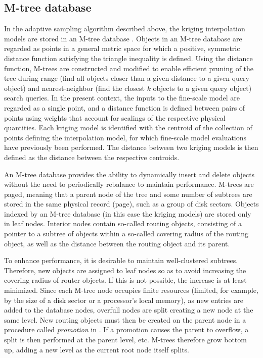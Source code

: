 \documentclass[12pt]{article}
\begin{document}
\subsection{M-tree database}

In the adaptive sampling algorithm described above, the kriging
interpolation models are stored in an M-tree database
\cite{Ciaccia1997}.  Objects in an M-tree database are regarded as points in
a general metric space for which a positive, symmetric distance
function satisfying the triangle inequality is defined.  Using the
distance function, M-trees are constructed and modified to enable efficient
pruning of the tree during range (find all objects closer than a given
distance to a given query object) and nearest-neighbor (find the
closest $k$ objects to a given query object) search queries.  
In the present context, the inputs to the fine-scale model 
are regarded as a single point, and a
distance function is defined between pairs of points using weights
that account for scalings of the respective physical quantities.  Each
kriging model is identified with the centroid of the collection of
points defining the interpolation model, for which fine-scale model evaluations have
previously been performed.  The distance between two kriging models is
then defined as the distance between the respective centroids.

An M-tree database provides the ability to dynamically insert and delete objects
without the need to periodically rebalance to maintain performance.
M-trees are paged, meaning that a parent node of the tree and some
number of subtrees are stored in the same physical record (page),
such as a group of disk sectors.  Objects indexed by an M-tree
database (in this case the kriging models) are stored only in leaf
nodes.  Interior nodes contain so-called routing objects, consisting of a
pointer to a subtree of objects within a so-called covering radius of the
routing object, as well as the distance between the routing object and
its parent.

To enhance performance, it is desirable to maintain well-clustered
subtrees.  Therefore, new objects are assigned to leaf nodes so as to
avoid increasing the covering radius of router objects.  If this is
not possible, the increase is at least minimized.  Since each M-tree node
occupies finite resources (limited, for example, by the size of a disk
sector or a processor's local memory), as new entries are added to
the database nodes, overfull nodes are split creating a new node at the
same level.  New routing objects must then be created on the parent
node in a procedure called {\it promotion} in \cite{Ciaccia1997}.  If
a promotion causes the parent to overflow, a split is then performed
at the parent level, etc.  M-trees therefore grow bottom up, adding a
new level as the current root node itself splits.
\end{document}
